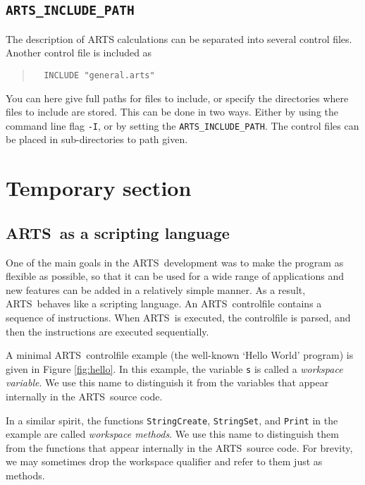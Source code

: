 \subsection*{\texttt{ARTS\_INCLUDE\_PATH}}

The description of ARTS calculations can be separated into several
control files. Another control file is included as
\begin{quote}
\begin{verbatim}
  INCLUDE "general.arts"
\end{verbatim}
\end{quote}
You can here give full paths for files to include, or specify the
directories where files to include are stored. This can be done in two
ways. Either by using the command line flag \verb|-I|, or by setting
the  \texttt{ARTS\_INCLUDE\_PATH}. The control
files can be placed in sub-directories to path given.




\section{Temporary section}

\subsection{ARTS\ as a scripting language}
%
One of the main goals in the ARTS\ development was to make the program as
flexible as possible, so that it can be used for a wide range of applications
and new features can be added in a relatively simple manner. As a result,
ARTS\ behaves like a scripting language. An ARTS\ controlfile contains a
sequence of instructions. When ARTS\ is executed, the controlfile is parsed,
and then the instructions are executed sequentially.

A minimal ARTS\ controlfile example (the well-known `Hello World' program) is
given in Figure \ref{fig:hello}. In this example, the variable \texttt{s} is
called a \emph{workspace variable}. We use this name to distinguish it from the
variables that appear internally in the ARTS\ source code.

In a similar spirit, the functions \texttt{StringCreate}, \texttt{StringSet},
and \texttt{Print} in the example are called \emph{workspace methods}. We use
this name to distinguish them from the functions that appear internally in the
ARTS\ source code. For brevity, we may sometimes drop the workspace qualifier
and refer to them just as methods.

